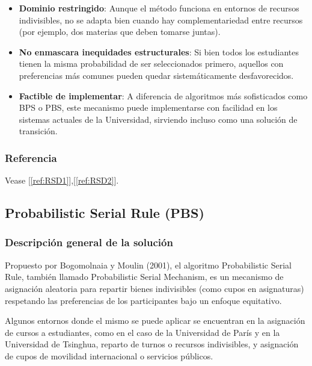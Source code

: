 \documentclass{article}
\begin{document}
\begin{itemize}
    \item \textbf{Dominio restringido}: Aunque el método funciona en entornos de recursos indivisibles, no se adapta bien cuando hay complementariedad entre recursos (por ejemplo, dos materias que deben tomarse juntas).
    \item \textbf{No enmascara inequidades estructurales}: Si bien todos los estudiantes tienen la misma probabilidad de ser seleccionados primero, aquellos con preferencias más comunes pueden quedar sistemáticamente desfavorecidos.
    \item \textbf{Factible de implementar}: A diferencia de algoritmos más sofisticados como BPS o PBS, este mecanismo puede implementarse con facilidad en los sistemas actuales de la Universidad, sirviendo incluso como una solución de transición.
\end{itemize}

\subsubsection{Referencia}



Vease [\ref{ref:RSD1}],[\ref{ref:RSD2}].

\subsection{Probabilistic Serial Rule (PBS)}

\subsubsection{Descripción general de la solución}

Propuesto por Bogomolnaia y Moulin (2001), el algoritmo Probabilistic Serial Rule, también llamado 
Probabilistic Serial Mechanism, es un 
mecanismo de asignación aleatoria para repartir bienes indivisibles (como cupos en asignaturas) 
respetando las preferencias de los participantes bajo un enfoque equitativo.

Algunos entornos donde el mismo se puede aplicar se encuentran en la asignación de cursos a estudiantes,
como en el caso de la Universidad de París y en la Universidad de Tsinghua, reparto de turnos o 
recursos indivisibles, y asignación de cupos de movilidad internacional o servicios públicos.
\end{document}
